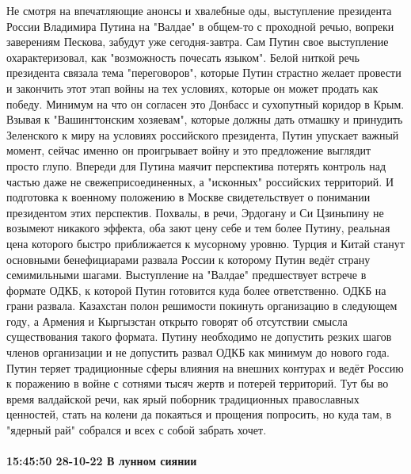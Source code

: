 Не смотря на впечатляющие анонсы и хвалебные оды, выступление президента России
Владимира Путина на "Валдае" в общем-то с проходной речью, вопреки заверениям
Пескова, забудут уже сегодня-завтра. Сам Путин свое выступление
охарактеризовал, как "возможность почесать языком". Белой ниткой речь
президента связала тема "переговоров", которые Путин страстно желает провести и
закончить этот этап войны на тех условиях, которые он может продать как победу.
Минимум на что он согласен это Донбасс и сухопутный коридор в Крым. Взывая к
"Вашингтонским хозяевам", которые должны дать отмашку и принудить Зеленского к
миру на условиях российского президента, Путин упускает важный момент, сейчас
именно он проигрывает войну и это предложение выглядит просто глупо. Впереди
для Путина маячит перспектива потерять контроль над частью даже не
свежеприсоединенных, а "исконных" российских территорий. И подготовка к
военному положению в Москве свидетельствует о понимании президентом этих
перспектив. Похвалы, в речи, Эрдогану и Си Цзиньпину не возымеют никакого
эффекта, оба зают цену себе и тем более Путину, реальная цена которого быстро
приближается к мусорному уровню. Турция и Китай станут основными бенефициарами
развала России к которому Путин ведёт страну семимильными шагами. Выступление
на "Валдае" предшествует встрече в формате ОДКБ, к которой Путин готовится куда
более ответственно. ОДКБ на грани развала. Казахстан полон решимости покинуть
организацию в следующем году, а Армения и Кыргызстан открыто говорят об
отсутствии смысла существования такого формата. Путину необходимо не допустить
резких шагов членов организации и не допустить развал ОДКБ как минимум до
нового года. Путин теряет традиционные сферы влияния на внешних контурах и
ведёт Россию к поражению в войне с сотнями тысяч жертв и потерей территорий.
Тут бы во время валдайской речи, как ярый поборник традиционных православных
ценностей, стать на колени да покаяться и прощения попросить, но куда там, в
"ядерный рай" собрался и всех с собой забрать хочет.

\paragraph{15:45:50 28-10-22 В лунном сиянии}


